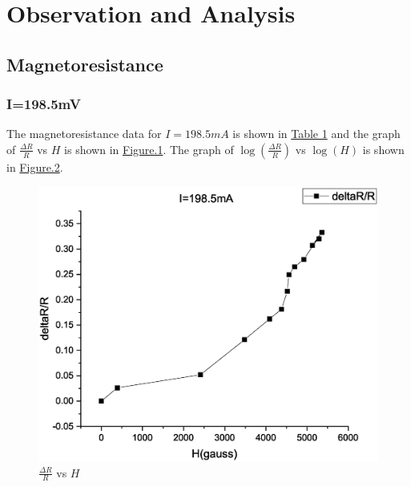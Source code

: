 \section{\label{sec:level1}Observation and Analysis}
    \subsection{Magnetoresistance}
    
        \subsubsection{I=198.5mV}
            The magnetoresistance data for $I=198.5mA$ is shown in \hyperref[tab:mag1]{Table 1} and the graph of $\frac{\Delta R}{R}$ vs $H$ is shown in \hyperref[fig:graph1]{Figure.1}. The graph of $\log (\frac{\Delta R}{R})$  vs $\log(H)$ is shown in \hyperref[fig:graph2]{Figure.2}.
            
            \begin{figure}[]
                \centering
                \includegraphics[width=0.95\columnwidth]{images/Graph1.eps}
                \caption{$\frac{\Delta R}{R}$ vs $H$}
                \label{fig:graph1}
            \end{figure}
